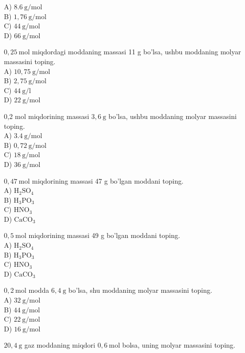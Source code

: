 A) $8.6 \mathrm{~g} / \mathrm{mol}$\\
B) $1,76 \mathrm{~g} / \mathrm{mol}$\\
C) $44 \mathrm{~g} / \mathrm{mol}$\\
D) $66 \mathrm{~g} / \mathrm{mol}$
  \item $0,25 \mathrm{~mol}$ miqdordagi moddaning massasi 11 g bo'lsa, ushbu moddaning molyar massasini toping.\\
A) $10,75 \mathrm{~g} / \mathrm{mol}$\\
B) $2,75 \mathrm{~g} / \mathrm{mol}$\\
C) $44 \mathrm{~g} / \mathrm{l}$\\
D) $22 \mathrm{~g} / \mathrm{mol}$
  \item 0,2 mol miqdorining massasi $3,6 \mathrm{~g}$ bo'lsa, ushbu moddaning molyar massasini toping.\\
A) $3.4 \mathrm{~g} / \mathrm{mol}$\\
B) $0,72 \mathrm{~g} / \mathrm{mol}$\\
C) $18 \mathrm{~g} / \mathrm{mol}$\\
D) $36 \mathrm{~g} / \mathrm{mol}$
  \item $0,47 \mathrm{~mol}$ miqdorining massasi 47 g bo'lgan moddani toping.\\
A) $\mathrm{H}_{2} \mathrm{SO}_{4}$\\
B) $\mathrm{H}_{3} \mathrm{PO}_{3}$\\
C) $\mathrm{HNO}_{3}$\\
D) $\mathrm{CaCO}_{3}$
  \item $0,5 \mathrm{~mol}$ miqdorining massasi 49 g bo'lgan moddani toping.\\
A) $\mathrm{H}_{2} \mathrm{SO}_{4}$\\
B) $\mathrm{H}_{3} \mathrm{PO}_{3}$\\
C) $\mathrm{HNO}_{3}$\\
D) $\mathrm{CaCO}_{3}$
  \item $0,2 \mathrm{~mol}$ modda $6,4 \mathrm{~g}$ bo'lsa, shu moddaning molyar massasini toping.\\
A) $32 \mathrm{~g} / \mathrm{mol}$\\
B) $44 \mathrm{~g} / \mathrm{mol}$\\
C) $22 \mathrm{~g} / \mathrm{mol}$\\
D) $16 \mathrm{~g} / \mathrm{mol}$
  \item $20,4 \mathrm{~g}$ gaz moddaning miqdori $0,6 \mathrm{~mol}$ bolsa, uning molyar massasini toping.\\
